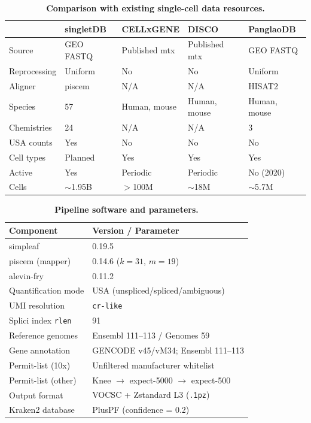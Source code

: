 \documentclass[10pt,twocolumn,letterpaper]{article}
\begin{document}
\begin{table}[t]
  \centering
  \caption{\textbf{Comparison with existing single-cell data resources.}}
  \label{tab:comparison}
  \small
  \begin{tabularx}{\columnwidth}{lXXXX}
    \toprule
    & \textbf{singletDB} & \textbf{CELLxGENE} & \textbf{DISCO} & \textbf{PanglaoDB} \\
    \midrule
    Source & GEO FASTQ & Published mtx & Published mtx & GEO FASTQ \\
    Reprocessing & Uniform & No & No & Uniform \\
    Aligner & piscem & N/A & N/A & HISAT2 \\
    Species & 57 & Human, mouse & Human, mouse & Human, mouse \\
    Chemistries & 24 & N/A & N/A & 3 \\
    USA counts & Yes & No & No & No \\
    Cell types & Planned & Yes & Yes & Yes \\
    Active & Yes & Periodic & Periodic & No (2020) \\
    Cells & $\sim$1.95B & $>$100M & $\sim$18M & $\sim$5.7M \\
    \bottomrule
  \end{tabularx}
\end{table}

\begin{table}[t]
  \centering
  \caption{\textbf{Pipeline software and parameters.}}
  \label{tab:software}
  \small
  \begin{tabular}{ll}
    \toprule
    \textbf{Component} & \textbf{Version / Parameter} \\
    \midrule
    simpleaf & 0.19.5 \\
    piscem (mapper) & 0.14.6 ($k = 31$, $m = 19$) \\
    alevin-fry & 0.11.2 \\
    Quantification mode & USA (unspliced/spliced/ambiguous) \\
    UMI resolution & \texttt{cr-like} \\
    Splici index \texttt{rlen} & 91 \\
    Reference genomes & Ensembl 111--113 / Genomes 59 \\
    Gene annotation & GENCODE v45/vM34; Ensembl 111--113 \\
    Permit-list (10x) & Unfiltered manufacturer whitelist \\
    Permit-list (other) & Knee $\to$ expect-5000 $\to$ expect-500 \\
    Output format & VOCSC + Zstandard L3 (\texttt{.1pz}) \\
    Kraken2 database & PlusPF (confidence = 0.2) \\
    \bottomrule
  \end{tabular}
\end{table}



\end{document}
